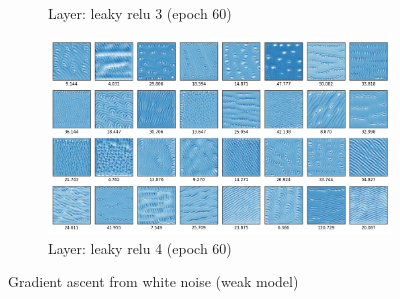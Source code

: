 \documentclass[12pt,a4paper]{extarticle}
\begin{document}
\begin{enumerate}
\begin{enumerate}
\begin{figure}[H]
\begin{subfigure}[t]{0.5\textwidth}
        \caption{Layer: leaky relu 3 (epoch 60)}
        \label{fig:weak_leaky_relu_3_e60}
      \end{subfigure}
      \begin{subfigure}[t]{0.5\textwidth}
        \centering
        \includegraphics[width=\linewidth]{images/weak_leaky_re_lu_4_e60.png}
        \caption{Layer: leaky relu 4 (epoch 60)}
        \label{fig:weak_leaky_relu_4_e60}
      \end{subfigure}
      \caption{Gradient ascent from white noise (weak model)}
      \label{fig:weak-ga-white-noise}
    \end{figure}


\end{enumerate}
\end{enumerate}
\end{document}

